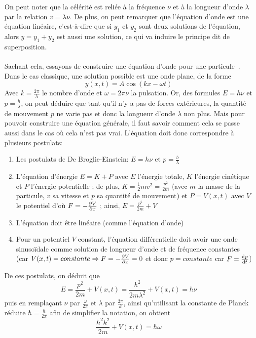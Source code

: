 On peut noter que la célérité est reliée à la fréquence $\nu$ et à la longueur d'onde $\lambda$ par la relation
$v = \lambda \nu$.
De plus, on peut remarquer que l'équation d'onde est une équation linéaire, c'est-à-dire que si $y_1$ et $y_2$
sont deux solutions de l'équation, alors $y = y_1 + y_2$ est aussi une solution, ce qui va induire le principe dit de superposition.\\ \\
Sachant cela, essayons de construire une équation d'onde pour une particule~\cite{schrodinger-eq}.
Dans le cas classique, une solution possible est une onde plane, de la forme
\[
    y(x,t) = A \cos \left( kx - \omega t \right)
\]
Avec $k = \frac{2 \pi}{\lambda}$ le nombre d'onde et $\omega = 2 \pi \nu$ la pulsation.
Or, des formules $E = h \nu$ et $p = \frac{h}{\lambda}$, on peut déduire que tant qu'il n'y a pas de forces
extérieures, la quantité de mouvement $p$ ne varie pas et donc la longueur d'onde $\lambda$ non plus.
Mais pour pouvoir construire une équation générale, il faut savoir comment cela se passe aussi dans le cas
où cela n'est pas vrai.
L'équation doit donc correspondre à plusieurs postulats:
\begin{enumerate}
    \item Les postulats de De Broglie-Einstein: $E = h \nu$ et $p = \frac{h}{\lambda}$
    \item L'équation d'énergie $E = K + P$ avec $E$ l'énergie totale, $K$ l'énergie cinétique et $P$ l'énergie
        potentielle ; de plus, $K = \frac{1}{2}mv^2 = \frac{p^2}{2m}$ (avec $m$ la masse de la particule, $v$ sa
        vitesse et $p$ sa quantité de mouvement) et $P = V(x,t)$ avec $V$ le potentiel d'où $F = - \pdv{V}{x}$ ;
        ainsi, $E = \frac{p^2}{2m} + V$
    \item L'équation doit être linéaire (comme l'équation d'onde)
    \item Pour un potentiel $V$ constant, l'équation différentielle doit avoir une onde sinusoïdale comme solution
        de longueur d'onde et de fréquence constantes (car $V(x,t) = constante \Rightarrow F = - \pdv{V}{x} = 0$
        et donc $p = constante$ car $F = \dv{p}{t}$)
\end{enumerate}
De ces postulats, on déduit que
\[
    E = \frac{p^2}{2m} + V(x,t) = \frac{h^2}{2m \lambda^2} + V(x,t) = h \nu
\]
puis en remplaçant $\nu$ par $\frac{\omega}{2 \pi}$ et $\lambda$ par $\frac{2 \pi}{k}$, ainsi qu'utilisant la constante
de Planck réduite $\hbar = \frac{h}{2 \pi}$ afin de simplifier la notation, on obtient
\[
    \frac{\hbar^2 k^2}{2m} + V(x,t) = \hbar \omega
\]
